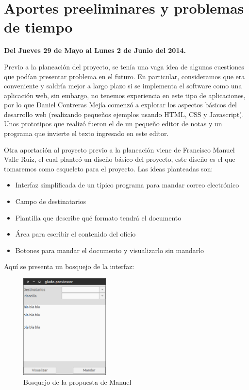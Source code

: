 \documentclass[letterpaper]{article}
\begin{document}
\section{Aportes preeliminares y problemas de tiempo}
\textbf{Del Jueves 29 de Mayo al Lunes 2 de Junio del 2014.}

Previo a la planeación del proyecto, se tenía una vaga idea de algunas cuestiones que podían presentar problema en el futuro. En particular, consideramos que era conveniente y saldría mejor a largo plazo si se implementa el software como una aplicación web, sin embargo, no tenemos experiencia en este tipo de aplicaciones, por lo que Daniel Contreras Mejía comenzó a explorar los aspectos básicos del desarrollo web (realizando pequeños ejemplos usando HTML, CSS y Javascript). Unos prototipos que realizó fueron el de un pequeño editor de notas y un programa que invierte el texto ingresado en este editor.

Otra aportación al proyecto previo a la planeación viene de Francisco Manuel Valle Ruiz, el cual planteó un diseño básico del proyecto, este diseño es el que tomaremos como esqueleto para el proyecto. Las ideas planteadas son:

\begin{itemize}
\item Interfaz simplificada de un típico programa para mandar correo electrónico
\item Campo de destinatarios
\item Plantilla que describe qué formato tendrá el documento
\item Área para escribir el contenido del oficio
\item Botones para mandar el documento y visualizarlo sin mandarlo
\end{itemize}

Aquí se presenta un bosquejo de la interfaz:

\begin{figure}[h!]
  \centering
    \includegraphics[width=0.4\textwidth]{graphics/sketch_ui.png}
    \caption{Bosquejo de la propuesta de Manuel}
\end{figure}
\end{document}
